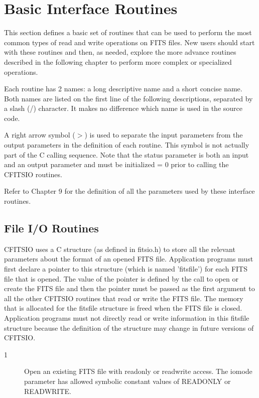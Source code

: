 \chapter{ Basic Interface Routines }

This section defines a basic set of routines that can be
used to perform the most common types of read and write operations
on FITS files.  New users should start with these routines and
then, as needed, explore the more advance routines described in
the following chapter to perform more complex or specialized operations.

Each routine has 2 names: a long descriptive
name and a short concise name.  Both names are listed on the first
line of the following descriptions, separated by a slash (/) character.
It makes no difference which name is used in the source code.

A right arrow symbol ($>$) is used to separate the input parameters from
the output parameters in the  definition of each routine.  This symbol
is not actually part of the C calling sequence.  Note that
the status parameter is both an input and an output parameter
and must be initialized = 0 prior to calling the CFITSIO routines.

Refer to Chapter 9 for the definition of all the parameters
used by these interface routines.


\section{File I/O Routines}

CFITSIO uses a C structure (as defined in fitsio.h) to store all the
relevant parameters about the format of an opened FITS file.
Application programs must first declare a pointer to this structure
(which is named 'fitsfile') for each FITS file that is opened.  The
value of the pointer is defined by the call to open or create the FITS
file and then the pointer must be passed as the first argument to all
the other CFITSIO routines that read or write the FITS file.  The
memory that is allocated for the fitsfile structure is freed when
the FITS file is closed.  Application programs must not directly
read or write information in this fitsfile structure because
the definition of the structure may change in future versions of
CFITSIO.


\begin{description}
\item[1 ] Open an existing FITS file with readonly or readwrite access.
    The iomode parameter has allowed symbolic constant values of
   READONLY or READWRITE.
\end{description}

